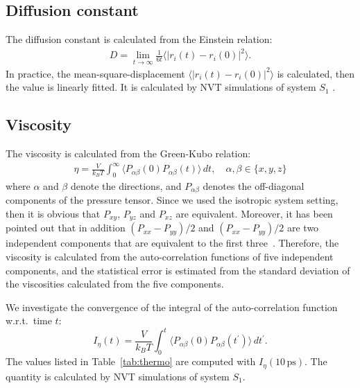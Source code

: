 \documentclass[a4paper,preprint,unsortedaddress,onecolumn,fleqn]{revtex4}
\begin{document}
\subsection{Diffusion constant}

The diffusion constant is calculated from the Einstein relation: 
\begin{align}
D = \lim_{t\rightarrow \infty}\frac {1}{6t} \langle \vert \mathbf{\mathit{r}}%
_i(t) - \mathbf{\mathit{r}}_i(0)\vert^2\rangle.
\end{align}
In practice, the mean-square-displacement $\langle\vert \mathbf{\mathit{r}}%
_i(t) - \mathbf{\mathit{r}}_i(0)\vert^2\rangle$ is calculated, then the
value is linearly fitted. It is calculated by NVT simulations of system $S_1$%
.

\subsection{Viscosity}

The viscosity is calculated from the Green-Kubo relation: 
\begin{align}
\eta = \frac{V}{k_BT}\int_0^\infty\langle P_{\alpha\beta}(0)
P_{\alpha\beta}(t)\rangle\,dt, \quad \alpha,\beta \in \{x, y, z\}
\end{align}
where $\alpha$ and $\beta$ denote the directions, and $P_{\alpha\beta}$
denotes the off-diagonal components of the pressure tensor. Since we used
the isotropic system setting, then it is obvious that $P_{xy}$, $P_{yz}$ and 
$P_{xz}$ are equivalent. Moreover, it has been pointed out that in addition $%
(P_{xx} - P_{yy})/2$ and $(P_{xx} - P_{yy})/2$ are two independent
components that are equivalent to the first three~\cite{alfe1998first}.
Therefore, the viscosity is calculated from the auto-correlation functions
of five independent components, and the statistical error is estimated from
the standard deviation of the viscosities calculated from the five
components.

We investigate the convergence of the integral of the auto-correlation
function w.r.t.~time $t$: 
\begin{equation*}
I_{\eta }(t)=\frac{V}{k_{B}T}\int_{0}^{t}\langle P_{\alpha \beta
}(0)P_{\alpha \beta }(t^{\prime })\rangle \,dt^{\prime }.
\end{equation*}%
The values listed in Table~\ref{tab:thermo} are computed with $I_{\eta }(10\,%
\text{ps})$. The quantity is calculated by NVT simulations of system $S_{1}$.

\newpage
\end{document}
